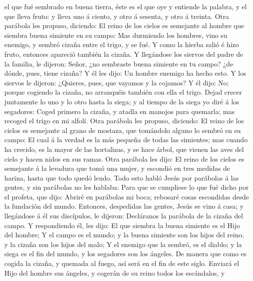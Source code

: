 el que fué sembrado en buena tierra, éste es el que oye y entiende la
palabra, y el que lleva fruto: y lleva uno á ciento, y otro á sesenta, y
otro á treinta.  Otra parábola les propuso, diciendo: El
reino de los cielos es semejante al hombre que siembra buena simiente en
su campo:  Mas durmiendo los hombres, vino su enemigo, y
sembró cizaña entre el trigo, y se fué.  Y como la hierba
salió é hizo fruto, entonces apareció también la cizaña. 
Y llegándose los siervos del padre de la familia, le dijeron: Señor, ¿no
sembraste buena simiente en tu campo? ¿de dónde, pues, tiene cizaña?
 Y él les dijo: Un hombre enemigo ha hecho esto. Y los
siervos le dijeron: ¿Quieres, pues, que vayamos y la cojamos?
 Y él dijo: No; porque cogiendo la cizaña, no arranquéis
también con ella el trigo.  Dejad crecer juntamente lo
uno y lo otro hasta la siega; y al tiempo de la siega yo diré á los
segadores: Coged primero la cizaña, y atadla en manojos para quemarla;
mas recoged el trigo en mi alfolí.  Otra parábola les
propuso, diciendo: El reino de los cielos es semejante al grano de
mostaza, que tomándolo alguno lo sembró en su campo:  El
cual á la verdad es la más pequeña de todas las simientes; mas cuando ha
crecido, es la mayor de las hortalizas, y se hace árbol, que vienen las
aves del cielo y hacen nidos en sus ramas.  Otra parábola
les dijo: El reino de los cielos es semejante á la levadura que tomó una
mujer, y escondió en tres medidas de harina, hasta que todo quedó leudo.
 Todo esto habló Jesús por parábolas á las gentes, y sin
parábolas no les hablaba:  Para que se cumpliese lo que
fué dicho por el profeta, que dijo: Abriré en parábolas mi boca;
rebosaré cosas escondidas desde la fundación del mundo. 
Entonces, despedidas las gentes, Jesús se vino á casa; y llegándose á él
sus discípulos, le dijeron: Decláranos la parábola de la cizaña del
campo.  Y respondiendo él, les dijo: El que siembra la
buena simiente es el Hijo del hombre;  Y el campo es el
mundo; y la buena simiente son los hijos del reino, y la cizaña son los
hijos del malo;  Y el enemigo que la sembró, es el
diablo; y la siega es el fin del mundo, y los segadores son los ángeles.
 De manera que como es cogida la cizaña, y quemada al
fuego, así será en el fin de este siglo.  Enviará el Hijo
del hombre sus ángeles, y cogerán de su reino todos los escándalos, y
